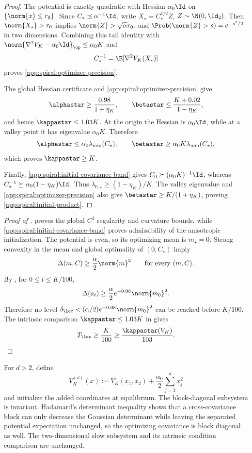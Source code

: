 \begin{proof}
The potential is exactly quadratic with Hessian \(\alpha_0\Id\) on
\(\{\norm{x}\leq r_0\}\).  Since
\(C_\star\preceq\alpha^{-1}\Id\), write
\(X_\star=C_\star^{1/2}Z\), \(Z\sim\N(0,\Id_2)\).  Then
\(\norm{X_\star}>r_0\) implies
\(\norm{Z}>\sqrt\alpha r_0\), and
\(\Prob(\norm{Z}>s)=e^{-s^2/2}\) in two dimensions.  Combining this tail
identity with
\(\norm{\nabla^2V_K-\alpha_0\Id}_{\op}\leq \alpha_0K\) and
\[
    C_\star^{-1}=\E[\nabla^2V_K(X_\star)]
\]
proves \eqref{app:spiral:optimizer-precision}.

The global Hessian certificate and
\eqref{app:spiral:optimizer-precision} give
\[
    \alphastar\geq\frac{0.98}{1+\eta_K},
    \qquad
    \betastar\leq\frac{K+0.02}{1-\eta_K},
\]
and hence \(\kappastar\leq1.03K\).  At the origin the Hessian is
\(\alpha_0\Id\), while at a valley point it has eigenvalue \(\alpha_0K\).  Therefore
\[
    \alphastar\leq \alpha_0\lambda_{\min}(C_\star),
    \qquad
    \betastar\geq \alpha_0K\lambda_{\min}(C_\star),
\]
which proves \(\kappastar\geq K\).

Finally,
\eqref{app:spiral:initial-covariance-band} gives
\(C_0\succeq(\alpha_0K)^{-1}\Id\), whereas
\(C_\star^{-1}\succeq \alpha_0(1-\eta_K)\Id\).  Thus
\(\lambda_{0,\star}\geq(1-\eta_K)/K\).  The valley eigenvalue and
\eqref{app:spiral:optimizer-precision} also give
\(\betastar\geq K/(1+\eta_K)\), proving
\eqref{app:spiral:initial-product}.
\end{proof}

\begin{proof}[Proof of ]
 proves the global \(C^3\)
regularity and curvature bounds, while
\eqref{app:spiral:initial-covariance-band} proves admissibility of the
anisotropic initialization.  The potential is even, so its optimizing
mean is \(m_\star=0\).  Strong convexity in the mean and global
optimality of \((0,C_\star)\) imply
\[
    \Delta(m,C)\geq\frac\alpha2\norm{m}^2
    \qquad\text{for every }(m,C).
\]
By , for \(0\leq t\leq K/100\),
\[
    \Delta(a_t)
    \geq\frac\alpha2e^{-0.08}\norm{m_0}^2.
\]
Therefore no level
\(\delta_{\loc}<(\alpha/2)e^{-0.08}\norm{m_0}^2\) can be reached before
\(K/100\).  The intrinsic comparison
\(\kappastar\leq1.03K\) in
 gives
\[
    T_{\loc}\geq\frac K{100}
    \geq\frac{\kappastar(V_K)}{103}.
\]
\end{proof}

For \(d>2\), define
\[
    V_K^{(d)}(x)
    :=V_K(x_1,x_2)+\frac{\alpha_0}{2}\sum_{j=3}^d x_j^2
\]
and initialize the added coordinates at equilibrium.  The block-diagonal
subsystem is invariant.  Hadamard's determinant inequality shows that a
cross-covariance block can only decrease the Gaussian determinant while
leaving the separated potential expectation unchanged, so the optimizing
covariance is block diagonal as well.  The two-dimensional slow subsystem and
its intrinsic condition comparison are unchanged.

